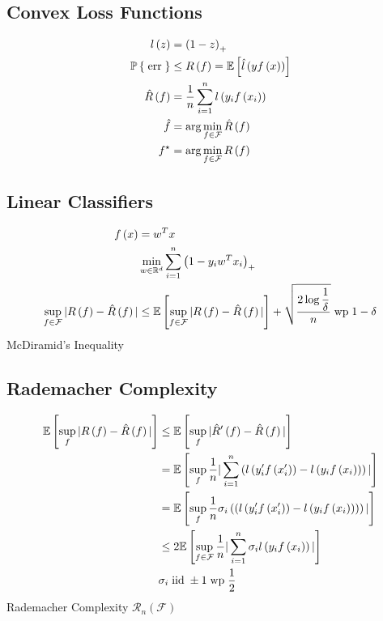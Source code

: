 \documentclass{article}
\begin{document}
\subsection{Convex Loss Functions}
\begin{align*}
l\left(z\right)  &= \left(1 - z\right)_{+}
\\ \mathbb{P}\left\{\text{\;err\;} \right\} &\leq  R\left(f\right) = \mathbb{E}\left[\hat{l}\left(y f\left(x\right)\right)\right]
\\ \hat{R}\left(f\right) &= \dfrac{1}{n} \displaystyle\sum_{i=1}^{n} l\left(y_{i} f\left(x_{i}\right)\right)
\\ \hat{f}&= \arg\displaystyle\min_{f \in \mathcal{F}} \hat{R}\left(f\right)
\\ f^\star  &= \arg\displaystyle\min_{f \in \mathcal{F}} R\left(f\right) 
\end{align*}


\subsection{Linear Classifiers}
\begin{align*}
f\left(x\right)  &= w^{T} x 
\\ &\displaystyle\min_{w \in \mathbb{R}^{d}} \displaystyle\sum_{i=1}^{n} \left(1 - y_{i} w^{T} x_{i}\right)_{+}
\\ \displaystyle\sup_{f \in \mathcal{F}} | R\left(f\right) - \hat{R}\left(f\right) | &\leq  \mathbb{E}\left[\displaystyle\sup_{f \in \mathcal{F}} | R\left(f\right) - \hat{R}\left(f\right) |\right] + \sqrt{\dfrac{2 \log \dfrac{1}{\delta}}{n}} \text{\;wp\;} 1 - \delta
\end{align*}
McDiramid's Inequality



\subsection{Rademacher Complexity}
\begin{align*}
\mathbb{E}\left[\displaystyle\sup_{f} | R\left(f\right) - \hat{R}\left(f\right) |\right] &\leq  \mathbb{E}\left[\displaystyle\sup_{f} | \hat{R}'\left(f\right) - \hat{R}\left(f\right) |\right]
\\ &= \mathbb{E}\left[\displaystyle\sup_{f} \dfrac{1}{n} | \displaystyle\sum_{i=1}^{n} \left(l\left(y'_{i} f\left(x'_{i}\right)\right) - l\left(y_{i} f\left(x_{i}\right)\right)\right) |\right]
\\ &= \mathbb{E}\left[\displaystyle\sup_{f} \dfrac{1}{n} \sigma_{i} \left(\left(l\left(y'_{i} f\left(x'_{i}\right)\right) - l\left(y_{i} f\left(x_{i}\right)\right)\right)\right) |\right]
\\ &\leq  2 \mathbb{E}\left[\displaystyle\sup_{f \in \mathcal{F}} \dfrac{1}{n} | \displaystyle\sum_{i=1}^{n} \sigma_{i} l\left(y_{i} f\left(x_{i}\right)\right) |\right]
\\ &\sigma_{i} \text{\;iid\;} \pm 1 \text{\;wp\;} \dfrac{1}{2}
\end{align*}
Rademacher Complexity $\mathcal{R}_{n}\left(\mathcal{F}\right)$
\end{document}
